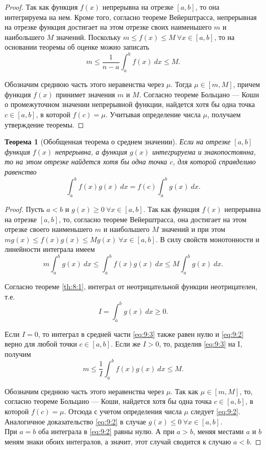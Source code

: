 \documentclass[12pt]{article}
\numberwithin{equation}{section}
\newtheorem{theorem}{Теорема}[section]
\begin{document}
\begin{proof}
Так как функция $f(x)$ непрерывна на отрезке $[a,b]$, то она интегрируема на нем. Кроме того, согласно теореме Вейерштрасса, непрерывная на отрезке функция достигает на этом отрезке своих наименьшего $m$ и наибольшего $M$ значений. Поскольку $m \leqslant f(x) \leqslant M~\forall x \in [a,b]$, то на основании теоремы об оценке можно записать 
\[ m \leqslant \frac{1}{n-a} \int_a^b f(x)~dx \leqslant M.\]

Обозначим среднюю часть этого неравенства через $\mu$. Тогда $\mu \in [m, M]$, причем функция $f(x)$ принимет значения $m$ и $M$.  Согласно теореме Больцано --- Коши о промежуточном значении непрерывной функции, найдется хотя бы одна точка $c \in [a,b]$, в которой $f(c) = \mu$. Учитывая определение числа $\mu$, получаем утверждение теоремы.
\end{proof}
\begin{theorem} [Обобщенная теорема о среднем значении]
Если на отрезке $[a,b]$ функция $f(x)$ непрерывна, а функция $g(x)$ интегрируема и знакопостоянна, то на этом отрезке найдется хотя бы одна точка $c$, для которой справделиво равенство
\begin{equation}
\int_a^b f(x) g(x)~dx = f(c) \int_a^b g(x)~dx. \label{eq:9:2}
\end{equation}
\end{theorem}
\begin{proof}
Пусть $a < b$ и $g(x) \geqslant 0~\forall x \in [a,b]$. Так как функция $f(x)$ непрерывна на отрезке $[a,b]$, то, согласно теореме Вейерштрасса, она достигает на этом отрезке своего наименьшего $m$ и наибольшего $M$ значений и при этом $m g(x) \leqslant f(x)g(x) \leqslant Mg(x)~\forall x \in [a,b]$. В силу свойств монотонности и линейности интеграла имеем
\begin{equation}
m \int_a^b g(x)~dx \leqslant \int_a^b f(x) g(x) ~dx \leqslant M \int_a^b g(x)~dx. \label{eq:9:3}
\end{equation}

Согласно теореме \ref{th:8:1}, интеграл от неотрицательной функции неотрицателен, т.е.
\[ I = \int_a^b g(x)~dx \geqslant 0.\]

Если $I = 0$, то интеграл в средней части \eqref{eq:9:3} также равен нулю и \eqref{eq:9:2} верно для любой точки $c \in [a,b]$. Если же $I > 0$, то, разделив \eqref{eq:9:3} на I, получим
\[ m \leqslant \frac{1}{I} \int_a^b f(x) g(x) ~dx \leqslant M.\]

Обозначим среднюю часть этого неравенства через $\mu$. Так как $\mu \in [m, M]$, то, согласно теореме Больцано --- Коши, найдется хотя бы одна точка $c \in [a,b]$, в которой  $f(c) = \mu$. Отсюда с учетом определения числа $\mu$ следует \eqref{eq:9:2}.\\

Аналогичное доказательство \eqref{eq:9:2} в случае $g(x) \leqslant 0~\forall x \in [a,b]$.\\

При $a = b$ оба интеграла в \eqref{eq:9:2} равны нулю. А при $a > b$, меняя местами $a$ и $b$ меням знаки обоих интегралов, а значит, этот случай сводится к случаю $a < b$.
\end{proof}
\end{document}
